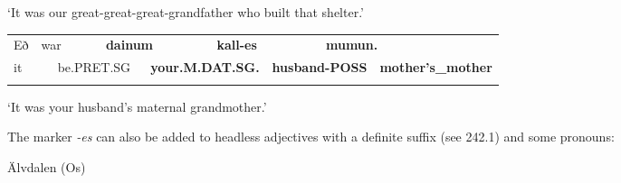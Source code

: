 \footnotetext{}

\begin{styleTranslation}
‘It was our great-great-great-grandfather who built that shelter.’

\end{styleTranslation}

\begin{tabular}{llllllllll}
\lsptoprule
Eð & \multicolumn{2}{l}{war

} & \multicolumn{2}{l}{{\bfseries dainum}

} & \multicolumn{2}{l}{{\bfseries kall-es}

} & \multicolumn{2}{l}{{\bfseries mumun.}

} & \\
\multicolumn{2}{l}{it

} & \multicolumn{2}{l}{be.PRET.SG

} & \multicolumn{2}{l}{{\bfseries your.M.DAT.SG.}

} & \multicolumn{2}{l}{{\bfseries husband-POSS}

} & \multicolumn{2}{l}{{\bfseries mother’s\_mother}

}\\
\lspbottomrule
\end{tabular}

\begin{styleTranslation}
‘It was your husband’s maternal grandmother.’

\end{styleTranslation}

\begin{styleBodyTextFirst}
The marker\textit{ -}\textit{es} can also be added to headless adjectives with a definite suffix (see 242.1) and some pronouns:

\end{styleBodyTextFirst}


\begin{listWWNumileveli}
\item 

\begin{styleExample}
Älvdalen (Os)\ \ 

\end{styleExample}

\end{listWWNumileveli}

\begin{listWWNumlxxixleveli}
\item 

\end{listWWNumlxxixleveli}

